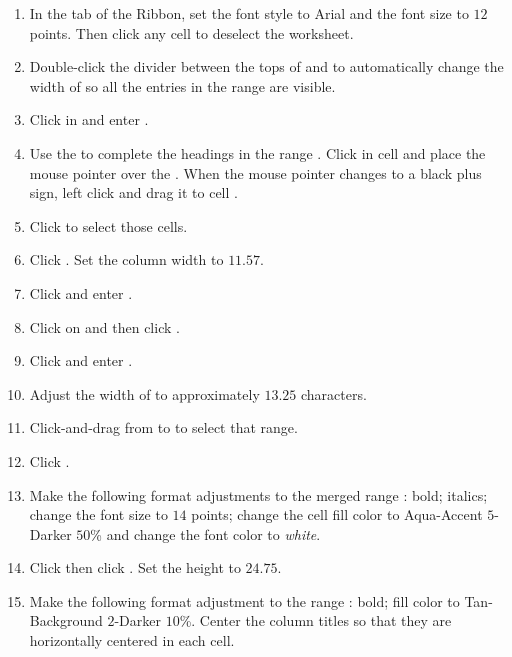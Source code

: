 \begin{enumerate}[resume]
	\item In the  tab of the Ribbon, set the font style to Arial and the font size to $ 12 $ points. Then click any cell to deselect the worksheet.
	\item Double-click the divider between the tops of  and  to automatically change the width of  so all the entries in the range  are visible. 
	\item Click in  and enter .
	\item Use the  to complete the headings in the range . Click in cell  and place the mouse pointer over the . When the mouse pointer changes to a black plus sign, left click and drag it to cell .
	\item Click  to select those cells. 
	\item Click . Set the column width to $ 11.57 $.
	\item Click  and enter .
	\item Click on  and then click .
	\item Click  and enter .
	\item Adjust the width of  to approximately $ 13.25 $ characters.
	\item Click-and-drag from  to  to select that range. 
	\item Click .
	\item Make the following format adjustments to the merged range : bold; italics; change the font size to $ 14 $ points; change the cell fill color to Aqua-Accent $ 5 $-Darker $ 50 $\% and change the font color to \textit{white}.
	\item Click  then click . Set the height to $ 24.75 $.
	\item Make the following format adjustment to the range : bold; fill color to Tan-Background $ 2 $-Darker $ 10 $\%. Center the column titles so that they are horizontally centered in each cell.

\end{enumerate}
